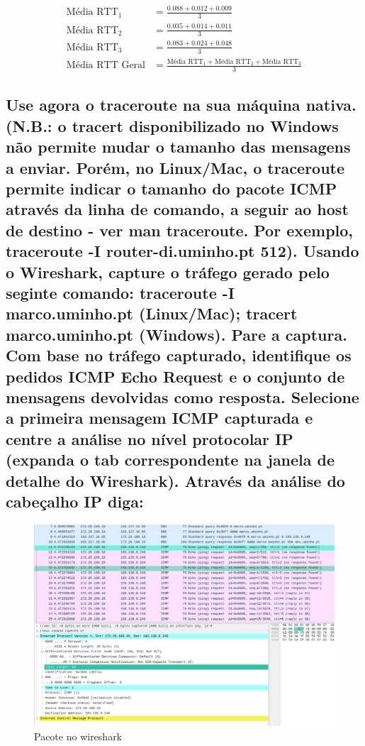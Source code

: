 \documentclass{article}
\begin{document}
\begin{align*}
\text{Média RTT}_1 &= \frac{0.088 + 0.012 + 0.009}{3} \\
\text{Média RTT}_2 &= \frac{0.035 + 0.014 + 0.011}{3} \\
\text{Média RTT}_3 &= \frac{0.083 + 0.024 + 0.048}{3} \\
\text{Média RTT Geral} &= \frac{\text{Média RTT}_1 + \text{Média RTT}_2 + \text{Média RTT}_3}{3}
\end{align*}

\subsection{Use agora o traceroute na sua máquina nativa. (N.B.: o tracert disponibilizado no Windows não permite mudar o tamanho das mensagens a enviar. Porém, no Linux/Mac, o traceroute permite indicar o tamanho do pacote ICMP através da linha de comando, a seguir ao host de destino - ver man traceroute. Por exemplo, traceroute -I router-di.uminho.pt 512). Usando o Wireshark, capture o tráfego gerado pelo seginte comando: traceroute -I marco.uminho.pt (Linux/Mac); tracert marco.uminho.pt (Windows). Pare a captura. Com base no tráfego capturado, identifique os pedidos ICMP Echo Request e o conjunto de mensagens devolvidas como resposta. Selecione a primeira mensagem ICMP capturada e centre a análise no nível protocolar IP (expanda o tab correspondente na janela de detalhe do Wireshark). Através da análise do cabeçalho IP diga:}

\begin{figure}[h]
    \centering
    \includegraphics[width=1\textwidth]{images/PacoteQuestao2.png}
    \caption{\label{fig:pacote}Pacote no wireshark}
\end{figure}
\end{document}
